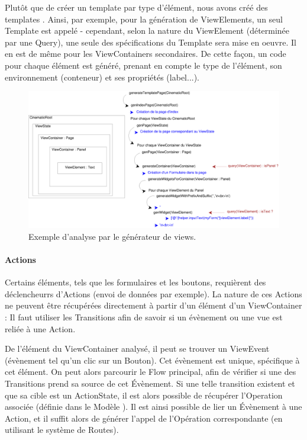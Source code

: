 Plutôt que de créer un template par type d'élément, nous avons créé des templates . Ainsi, par exemple, pour la génération de ViewElements, un seul Template est appelé - cependant, selon la nature du ViewElement (déterminée par une Query), une seule des spécifications du Template sera mise en oeuvre. Il en est de même pour les ViewContainers secondaires. De cette façon, un code  pour chaque élément est généré, prenant en compte le type de l'élément, son environnement (conteneur) et ses propriétés (label...).
\newline
\begin{figure}[H]
  \centering
  \includegraphics[scale=.35]{img/viewexample.eps}
  \caption{Exemple d'analyse par le générateur de views.}
  \label{fig: exemple generateur view}
\end{figure}
\paragraph{Actions}
Certains éléments, tels que les formulaires et les boutons, requièrent des déclencheurrs d'Actions (envoi de données par exemple). La nature de ces Actions ne peuvent être récupérées directement à partir d'un élément d'un ViewContainer : Il faut utiliser les Transitions afin de savoir si un évènement ou une vue est reliée à une Action.

De l'élément du ViewContainer analysé, il peut se trouver un ViewEvent (évènement tel qu'un clic sur un Bouton). Cet évènement est unique, spécifique à cet élément. On peut alors parcourir le Flow principal, afin de vérifier si une des Transitions prend sa source de cet Évènement. Si une telle transition existent et que sa cible est un ActionState, il est alors possible de récupérer l'Operation associée (définie dans le Modèle \kwsoa). Il est ainsi possible de lier un Évènement à une Action, et il suffit alors de générer l'appel de l'Opération correspondante (en utilisant le système de Routes).

